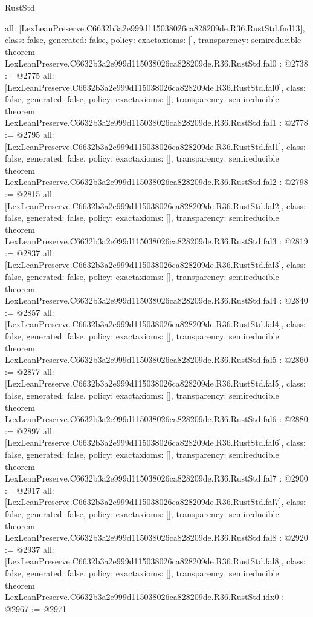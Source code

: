 \begin{lexlean}{RustStd}
\begin{coremodule}
{  all: [LexLeanPreserve.C6632b3a2e999d115038026ca828209de.R36.RustStd.fnd13],
  class: false,
  generated: false,
  policy: exact{axioms: []},
  transparency: semireducible
}
theorem LexLeanPreserve.C6632b3a2e999d115038026ca828209de.R36.RustStd.fal0 : @2738 := @2775 {
  all: [LexLeanPreserve.C6632b3a2e999d115038026ca828209de.R36.RustStd.fal0],
  class: false,
  generated: false,
  policy: exact{axioms: []},
  transparency: semireducible
}
theorem LexLeanPreserve.C6632b3a2e999d115038026ca828209de.R36.RustStd.fal1 : @2778 := @2795 {
  all: [LexLeanPreserve.C6632b3a2e999d115038026ca828209de.R36.RustStd.fal1],
  class: false,
  generated: false,
  policy: exact{axioms: []},
  transparency: semireducible
}
theorem LexLeanPreserve.C6632b3a2e999d115038026ca828209de.R36.RustStd.fal2 : @2798 := @2815 {
  all: [LexLeanPreserve.C6632b3a2e999d115038026ca828209de.R36.RustStd.fal2],
  class: false,
  generated: false,
  policy: exact{axioms: []},
  transparency: semireducible
}
theorem LexLeanPreserve.C6632b3a2e999d115038026ca828209de.R36.RustStd.fal3 : @2819 := @2837 {
  all: [LexLeanPreserve.C6632b3a2e999d115038026ca828209de.R36.RustStd.fal3],
  class: false,
  generated: false,
  policy: exact{axioms: []},
  transparency: semireducible
}
theorem LexLeanPreserve.C6632b3a2e999d115038026ca828209de.R36.RustStd.fal4 : @2840 := @2857 {
  all: [LexLeanPreserve.C6632b3a2e999d115038026ca828209de.R36.RustStd.fal4],
  class: false,
  generated: false,
  policy: exact{axioms: []},
  transparency: semireducible
}
theorem LexLeanPreserve.C6632b3a2e999d115038026ca828209de.R36.RustStd.fal5 : @2860 := @2877 {
  all: [LexLeanPreserve.C6632b3a2e999d115038026ca828209de.R36.RustStd.fal5],
  class: false,
  generated: false,
  policy: exact{axioms: []},
  transparency: semireducible
}
theorem LexLeanPreserve.C6632b3a2e999d115038026ca828209de.R36.RustStd.fal6 : @2880 := @2897 {
  all: [LexLeanPreserve.C6632b3a2e999d115038026ca828209de.R36.RustStd.fal6],
  class: false,
  generated: false,
  policy: exact{axioms: []},
  transparency: semireducible
}
theorem LexLeanPreserve.C6632b3a2e999d115038026ca828209de.R36.RustStd.fal7 : @2900 := @2917 {
  all: [LexLeanPreserve.C6632b3a2e999d115038026ca828209de.R36.RustStd.fal7],
  class: false,
  generated: false,
  policy: exact{axioms: []},
  transparency: semireducible
}
theorem LexLeanPreserve.C6632b3a2e999d115038026ca828209de.R36.RustStd.fal8 : @2920 := @2937 {
  all: [LexLeanPreserve.C6632b3a2e999d115038026ca828209de.R36.RustStd.fal8],
  class: false,
  generated: false,
  policy: exact{axioms: []},
  transparency: semireducible
}
theorem LexLeanPreserve.C6632b3a2e999d115038026ca828209de.R36.RustStd.idx0 : @2967 := @2971 {
}
\end{coremodule}
\end{lexlean}
